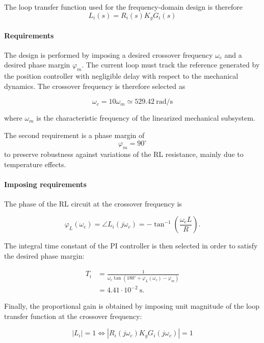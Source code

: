 The loop transfer function used for the frequency-domain design is therefore
\begin{equation}
    L_i(s) = R_i(s) K_g G_i(s)
\end{equation}


\paragraph{Requirements}
The design is performed by imposing a desired crossover frequency \(\omega_c\) and a desired phase margin \(\varphi_m\).
The current loop must track the reference generated by the position controller with negligible delay
with respect to the mechanical dynamics. The crossover frequency is therefore selected as

\[
    \omega_c = 10 \omega_m \simeq 529.42\ \mathrm{rad/s}
\]

where \(\omega_m\) is the characteristic frequency of the linearized mechanical subsystem.

The second requirement is a phase margin of
\[
\varphi_m = 90^\circ
\]
to preserve robustness against variations of the RL resistance, mainly due to temperature effects.

\paragraph{Imposing requirements}
The phase of the RL circuit at the crossover frequency is

\begin{equation}
\varphi_L(\omega_c)
    = \angle L_i(j\omega_c)
    = -\tan^{-1}\left(\frac{\omega_c L}{R}\right).
\end{equation}

The integral time constant of the PI controller is then selected in order to satisfy the desired phase margin:

\begin{equation}
\begin{aligned}
T_i 
&= \frac{1}
{\omega_c \tan\left(180^\circ + \varphi_L(\omega_c) - \varphi_m\right)} \\
&= 4.41 \cdot 10^{-2}\ \mathrm{s}.
\end{aligned}
\end{equation}

Finally, the proportional gain is obtained by imposing unit magnitude of the loop transfer function at the crossover frequency:

\begin{equation}
| L_i | = 1 \Leftrightarrow  \left|R_i(j\omega_c)K_gG_i(j\omega_c)\right| = 1
\end{equation}

